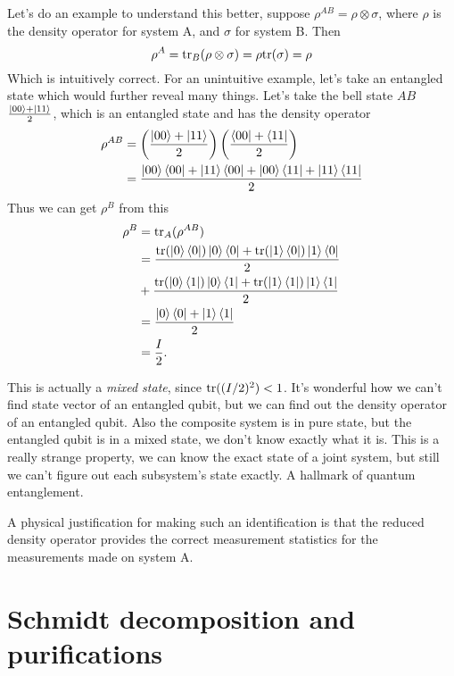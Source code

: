 Let's do an example to understand this better, suppose $\rho^{AB} = \rho \otimes \sigma$, where $\rho$ is the density operator for system A, and $\sigma$ for system B. Then
\begin{equation}
    \rho^{A} = \text{tr}_B(\rho \otimes \sigma) = \rho \text{tr}(\sigma) = \rho
\end{equation}
Which is intuitively correct. For an unintuitive example, let's take an entangled state which would further reveal many things. Let's take the bell state $AB$ $\frac{\ket{00} + \ket{11}}{2}$, which is an entangled state and has the density operator
\begin{align}
    \rho^{AB} &= \left(
        \frac{\ket{00} + \ket{11}}{2}
    \right) \left(
        \frac{\bra{00} + \bra{11}}{2}
    \right) \\
    &= \frac{
    \ket{00}\bra{00} + \ket{11}\bra{00} + \ket{00}\bra{11} + \ket{11}\bra{11}
    }{2}
\end{align}
Thus we can get $\rho^B$ from this
\begin{align}
    \rho^B &= \text{tr}_A(\rho^{AB}) \\
    &= \frac{
    \text{tr}(\ket{0}\bra{0})\ket{0}\bra{0}
    + \text{tr}(\ket{1}\bra{0})\ket{1}\bra{0}
    }{2}
    \\
    &+ \frac{
     \text{tr}(\ket{0}\bra{1})\ket{0}\bra{1}
    + \text{tr}(\ket{1}\bra{1})\ket{1}\bra{1}
    }{2}
    \\
    &= \frac{
    \ket{0}\bra{0} + \ket{1}\bra{1}
    }{2}
    \\ &=
    \frac{I}{2}.
\end{align}

This is actually a \textit{mixed state}, since $\text{tr}((I/2)^2) < 1$. It's wonderful how we can't find state vector of an entangled qubit, but we can find out the density operator of an entangled qubit. Also the composite system is in pure state, but the entangled qubit is in a mixed state, we don't know exactly what it is. This is a really strange property, we can know the exact state of a joint system, but still we can't figure out each subsystem's state exactly. A hallmark of quantum entanglement.

A physical justification for making such an identification is that the reduced density operator provides the correct measurement statistics for the measurements made on system A.

\section{Schmidt decomposition and purifications}
